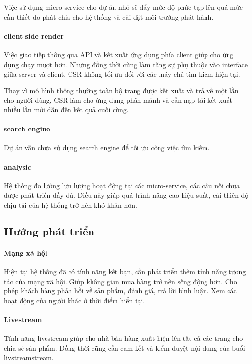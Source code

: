 \documentclass[11pt]{report}
\begin{document}
Việc sử dụng micro-service cho dự án nhỏ sẽ đẩy mức độ phức tạp lên quá mức cần thiết do phát chia cho hệ thống và cài đặt môi trường phát hành.

\paragraph{client side render} Việc giao tiếp thông qua API và kết xuất ứng dụng phía client giúp cho ứng dụng chạy mượt hơn. Nhưng đồng thời cũng làm tăng sự phụ thuộc vào interface giữa server và client. CSR không tối ưu đối với các máy chủ tìm kiếm hiện tại.

Thay vì mô hình thông thường toàn bộ trang được kết xuất và trả về một lần cho người dùng, CSR làm cho ứng dụng phân mảnh và cần nạp tải kết xuất nhiều lần mới dẫn đến kết quả cuối cùng.

\paragraph{search engine} Dự án vẫn chưa sử dụng search engine để tối ưu công việc tìm kiếm.

\paragraph{analysic} Hệ thống đo lường lưu lượng hoạt động tại các micro-service, các cầu nối chưa được phát triển đầy đủ. Điều này giúp quá trình nâng cao hiệu suất, cải thiên độ chịu tải của hệ thống trở nên khó khăn hơn.

\subsection{Hướng phát triển}

\paragraph{Mạng xã hội} Hiện tại hệ thống đã có tính năng kết bạn, cần phát triển thêm tính năng tương tác của mạng xã hội. Giúp không gian mua hàng trở nên sống động hơn. Cho phép khách hàng phản hồi về sản phẩm, đánh giá, trả lời bình luận. Xem các hoạt động của người khác ở thời điểm hiển tại.

\paragraph{Livestream} Tính năng livestream giúp cho nhà bán hàng xuất hiện lên tất cả các trang cho chia sẻ sản phẩm. Đồng thời cũng cần cam kết và kiểm duyệt nội dung của buổi livstreamstream.
\end{document}

